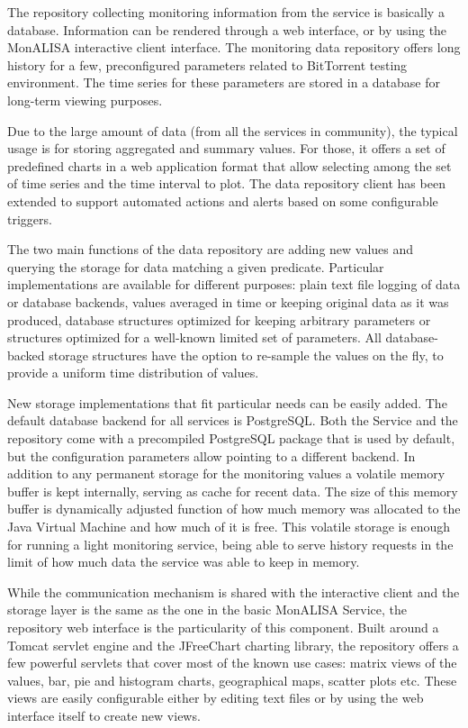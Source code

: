 The repository collecting monitoring information from the service is basically
a database. Information can be rendered through a web interface, or by using
the MonALISA interactive client interface. The monitoring data repository
offers long history for a few, preconfigured parameters related to BitTorrent
testing environment. The time series for these parameters are stored in a
database for long-term viewing purposes.

Due to the large amount of data (from all the services in community), the
typical usage is for storing aggregated and summary values. For those, it
offers a set of predefined charts in a web application format that allow
selecting among the set of time series and the time interval to plot. The data
repository client has been extended to support automated actions and alerts
based on some configurable triggers.

The two main functions of the data repository are adding new values and
querying the storage for data matching a given predicate. Particular
implementations are available for different purposes: plain text file logging
of data or database backends, values averaged in time or keeping original data
as it was produced, database structures optimized for keeping arbitrary
parameters or structures optimized for a well-known limited set of parameters.
All database-backed storage structures have the option to re-sample the values
on the fly, to provide a uniform time distribution of values.

New storage implementations that fit particular needs can be easily added. The
default database backend for all services is PostgreSQL. Both the Service and
the repository come with a precompiled PostgreSQL package that is used by
default, but the configuration parameters allow pointing to a different
backend. In addition to any permanent storage for the monitoring values a
volatile memory buffer is kept internally, serving as cache for recent data.
The size of this memory buffer is dynamically adjusted function of how much
memory was allocated to the Java Virtual Machine and how much of it is free.
This volatile storage is enough for running a light monitoring service, being
able to serve history requests in the limit of how much data the service was
able to keep in memory.

While the communication mechanism is shared with the interactive client and
the storage layer is the same as the one in the basic MonALISA Service, the
repository web interface is the particularity of this component. Built around
a Tomcat servlet engine and the JFreeChart charting library, the repository
offers a few powerful servlets that cover most of the known use cases: matrix
views of the values, bar, pie and histogram charts, geographical maps, scatter
plots etc. These views are easily configurable either by editing text files or
by using the web interface itself to create new views.

